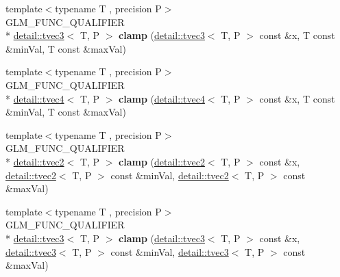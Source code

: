 \begin{DoxyCompactItemize}
\item 
\hypertarget{namespaceglm_a5480cd78f9efc725f850ea4f239bfd2d}{{\footnotesize template$<$typename T , precision P$>$ }\\G\-L\-M\-\_\-\-F\-U\-N\-C\-\_\-\-Q\-U\-A\-L\-I\-F\-I\-E\-R \\*
\hyperlink{structglm_1_1detail_1_1tvec3}{detail\-::tvec3}$<$ T, P $>$ {\bfseries clamp} (\hyperlink{structglm_1_1detail_1_1tvec3}{detail\-::tvec3}$<$ T, P $>$ const \&x, T const \&min\-Val, T const \&max\-Val)}\label{namespaceglm_a5480cd78f9efc725f850ea4f239bfd2d}

\item 
\hypertarget{namespaceglm_ada0741f13869762e0238572ba8c79d4a}{{\footnotesize template$<$typename T , precision P$>$ }\\G\-L\-M\-\_\-\-F\-U\-N\-C\-\_\-\-Q\-U\-A\-L\-I\-F\-I\-E\-R \\*
\hyperlink{structglm_1_1detail_1_1tvec4}{detail\-::tvec4}$<$ T, P $>$ {\bfseries clamp} (\hyperlink{structglm_1_1detail_1_1tvec4}{detail\-::tvec4}$<$ T, P $>$ const \&x, T const \&min\-Val, T const \&max\-Val)}\label{namespaceglm_ada0741f13869762e0238572ba8c79d4a}

\item 
\hypertarget{namespaceglm_a3619aef4490284ac6ca86a552652c143}{{\footnotesize template$<$typename T , precision P$>$ }\\G\-L\-M\-\_\-\-F\-U\-N\-C\-\_\-\-Q\-U\-A\-L\-I\-F\-I\-E\-R \\*
\hyperlink{structglm_1_1detail_1_1tvec2}{detail\-::tvec2}$<$ T, P $>$ {\bfseries clamp} (\hyperlink{structglm_1_1detail_1_1tvec2}{detail\-::tvec2}$<$ T, P $>$ const \&x, \hyperlink{structglm_1_1detail_1_1tvec2}{detail\-::tvec2}$<$ T, P $>$ const \&min\-Val, \hyperlink{structglm_1_1detail_1_1tvec2}{detail\-::tvec2}$<$ T, P $>$ const \&max\-Val)}\label{namespaceglm_a3619aef4490284ac6ca86a552652c143}

\item 
\hypertarget{namespaceglm_af80d006213e383bf05fd767386b14067}{{\footnotesize template$<$typename T , precision P$>$ }\\G\-L\-M\-\_\-\-F\-U\-N\-C\-\_\-\-Q\-U\-A\-L\-I\-F\-I\-E\-R \\*
\hyperlink{structglm_1_1detail_1_1tvec3}{detail\-::tvec3}$<$ T, P $>$ {\bfseries clamp} (\hyperlink{structglm_1_1detail_1_1tvec3}{detail\-::tvec3}$<$ T, P $>$ const \&x, \hyperlink{structglm_1_1detail_1_1tvec3}{detail\-::tvec3}$<$ T, P $>$ const \&min\-Val, \hyperlink{structglm_1_1detail_1_1tvec3}{detail\-::tvec3}$<$ T, P $>$ const \&max\-Val)}\label{namespaceglm_af80d006213e383bf05fd767386b14067}


\end{DoxyCompactItemize}
